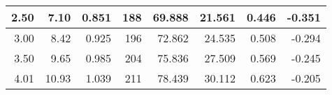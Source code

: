 \begin{table}[H]
\begin{tabular}{|r|r|r|r|r|r|r|r|}
		2.50                                                                                                  & 7.10                                                                                                         & 0.851                                             & 188                                                                                                    & 69.888                                                                                          & 21.561                                               & 0.446                                                    & -0.351                                                \\ \hline
		3.00                                                                                                  & 8.42                                                                                                         & 0.925                                             & 196                                                                                                    & 72.862                                                                                          & 24.535                                               & 0.508                                                    & -0.294                                                \\ \hline
		3.50                                                                                                  & 9.65                                                                                                         & 0.985                                             & 204                                                                                                    & 75.836                                                                                          & 27.509                                               & 0.569                                                    & -0.245                                                \\ \hline
		4.01                                                                                                  & 10.93                                                                                                        & 1.039                                             & 211                                                                                                    & 78.439                                                                                          & 30.112                                               & 0.623                                                    & -0.205                                                \\ \hline

\end{tabular}
\end{table}
